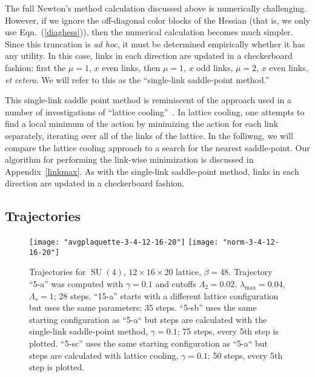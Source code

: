\documentclass[preprint,aps,prd]{revtex4-2}
\DeclareMathOperator{\SU}{SU}
\begin{document}
The full Newton's method calculation discussed above is numerically
challenging.
However, if we ignore the off-diagonal color blocks of the
Hessian (that is, we only use Eqn.~(\ref{diaghess})),
then the numerical calculation becomes much simpler.  Since this truncation
is {\em ad hoc}, it must be determined empirically whether it
has any utility.  In this case, links in each direction
are updated in a checkerboard fashion: first the
$\mu=1$, $x$ even links, then $\mu=1$, $x$ odd links,
$\mu=2$, $x$ even links, {\em et cetera}.  We will refer to this
as the ``single-link saddle-point method.''

This single-link saddle point method is reminiscent of the
approach used in a number of investigations of ``lattice
cooling''~\cite{trottier_exploring_1994,teper_cooling_1994,
  gonzalez-arroyo_gauge_1995,gonzalez-arroyo_classical_1996,
  bonati_comparison_2014}.
In lattice cooling, one attempts to find a local minimum
of the action by minimizing the action for
each link separately, iterating over all of the links of the lattice.
In the folliwng, we will compare the lattice cooling approach to
a search for the nearest saddle-point.  Our algorithm for performing
the link-wise minimization is discussed in Appendix~\ref{linkmax}.
As with the single-link saddle-point method, links in each direction
are updated in a checkerboard fashion.

\subsection{Trajectories}

\begin{figure}
\texttt{[image: "avgplaquette-3-4-12-16-20"]}
\hfill
\texttt{[image: "norm-3-4-12-16-20"]}
\caption{Trajectories for $\SU(4)$, $12 \times 16 \times 20$ lattice,
  $\beta=48$. Trajectory ``5-a'' was computed with $\gamma = 0.1$ and
  cutoffs $\Lambda_2=0.02$, $\lambda_\mathrm{max}=0.04$, $\Lambda_s = 1$;
  28 steps.
  ``15-a'' starts with a different lattice configuration but uses the
   same parameters; 35 steps.
   ``5-sb'' uses the same starting configuration as ``5-a`` but steps
   are calculated with the single-link saddle-point method,
     $\gamma=0.1$; 75 steps, every 5th step is plotted.
   ``5-sc'' uses the same starting configuration as ``5-a`` but steps
   are calculated with lattice cooling,
     $\gamma=0.1$; 50 steps, every 5th step is plotted.
    \label{trajectory3}}
\end{figure}
\end{document}
